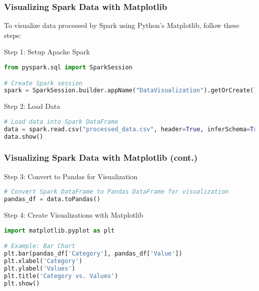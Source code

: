 \documentclass[aspectratio=169]{beamer}
\begin{document}
\begin{frame}[fragile]
    \frametitle{Visualizing Spark Data with Matplotlib}
    To visualize data processed by Spark using Python's Matplotlib, follow these steps:
    
    \begin{block}{Step 1: Setup Apache Spark}
    \begin{lstlisting}[language=Python]
from pyspark.sql import SparkSession

# Create Spark session
spark = SparkSession.builder.appName("DataVisualization").getOrCreate()
    \end{lstlisting}
    \end{block}

    \begin{block}{Step 2: Load Data}
    \begin{lstlisting}[language=Python]
# Load data into Spark DataFrame
data = spark.read.csv("processed_data.csv", header=True, inferSchema=True)
data.show()
    \end{lstlisting}
    \end{block}
\end{frame}

\begin{frame}[fragile]
    \frametitle{Visualizing Spark Data with Matplotlib (cont.)}
    \begin{block}{Step 3: Convert to Pandas for Visualization}
    \begin{lstlisting}[language=Python]
# Convert Spark DataFrame to Pandas DataFrame for visualization
pandas_df = data.toPandas()
    \end{lstlisting}
    \end{block}

    \begin{block}{Step 4: Create Visualizations with Matplotlib}
    \begin{lstlisting}[language=Python]
import matplotlib.pyplot as plt

# Example: Bar Chart
plt.bar(pandas_df['Category'], pandas_df['Value'])
plt.xlabel('Category')
plt.ylabel('Values')
plt.title('Category vs. Values')
plt.show()
    \end{lstlisting}
    \end{block}
\end{frame}
\end{document}
